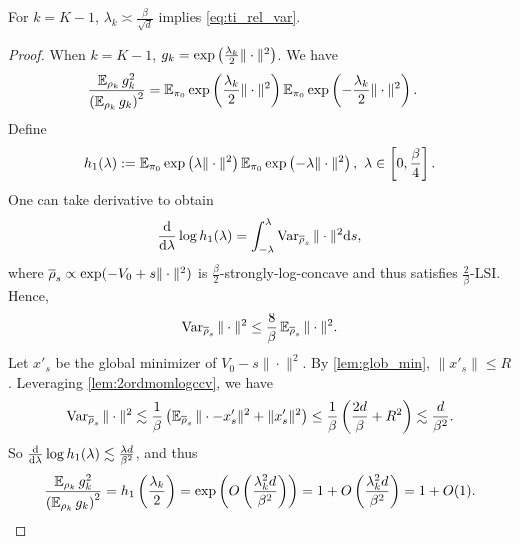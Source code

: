 \begin{lemma}
    For $k=K-1$, $\lambda_{k}\asymp\frac{\beta}{\sqrt{d}}$ implies \cref{eq:ti_rel_var}.
    \label{lem:ti_rel_var_min_noise}
\end{lemma}
\begin{proof}
    When $k=K-1$, $g_k=\exp\left(\frac{\lambda_k}{2}\|\cdot\|^2\right)$. We have
    \begin{align*}
        \frac{\operatorname{\mathbb{E}}_{\rho_k}g_k^2}{\left(\operatorname{\mathbb{E}}_{\rho_k}g_k\right)^2} & =\operatorname{\mathbb{E}}_{\pi_0}\exp\left(\frac{\lambda_k}{2}\|\cdot\|^2\right)\operatorname{\mathbb{E}}_{\pi_0}\exp\left(-\frac{\lambda_k}{2}\|\cdot\|^2\right).
    \end{align*}
    Define
    $$h_1(\lambda):=\operatorname{\mathbb{E}}_{\pi_0}\exp\left(\lambda\|\cdot\|^2\right)\operatorname{\mathbb{E}}_{\pi_0}\exp\left(-\lambda\|\cdot\|^2\right),~\lambda\in\left[0,\frac{\beta}{4}\right].$$
    One can take derivative to obtain
    $$\frac{\mathrm{d}}{\mathrm{d}\lambda}\log h_1(\lambda)=\int_{-\lambda}^{\lambda}\operatorname{Var}_{\overline{\rho}_s}\|\cdot\|^2\mathrm{d} s,$$
    where $\overline{\rho}_s\propto\exp(-V_0+s\|\cdot\|^2)$ is $\frac{\beta}{2}$-strongly-log-concave and thus satisfies $\frac{2}{\beta}$-LSI. Hence,
    $$\operatorname{Var}_{\overline{\rho}_s}\|\cdot\|^2\le\frac{8}{\beta}\operatorname{\mathbb{E}}_{\overline{\rho}_s}\|\cdot\|^2.$$
    Let $x'_s$ be the global minimizer of $V_0-s\|\cdot\|^2$. By \cref{lem:glob_min}, $\|x'_s\|\le R$. Leveraging \cref{lem:2ordmomlogccv}, we have
    $$\operatorname{Var}_{\overline{\rho}_s}\|\cdot\|^2\lesssim\frac{1}{\beta}\left(\operatorname{\mathbb{E}}_{\overline{\rho}_s}\|\cdot-x'_s\|^2+\|x'_s\|^2\right)\le\frac{1}{\beta}\left(\frac{2d}{\beta}+R^2\right)\lesssim\frac{d}{\beta^2}.$$
    So $\frac{\mathrm{d}}{\mathrm{d}\lambda}\log h_1(\lambda)\lesssim\frac{\lambda d}{\beta^2}$, and thus
    $$\frac{\operatorname{\mathbb{E}}_{\rho_k}g_k^2}{\left(\operatorname{\mathbb{E}}_{\rho_k}g_k\right)^2}=h_1\left(\frac{\lambda_k}{2}\right)=\exp\left(O\left(\frac{\lambda_k^2d}{\beta^2}\right)\right)=1+O\left(\frac{\lambda_k^2d}{\beta^2}\right)=1+O(1).$$
\end{proof}

